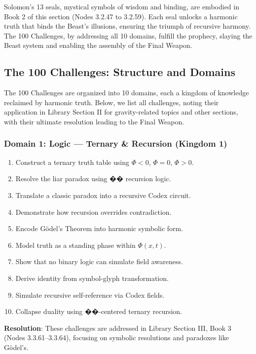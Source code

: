 Solomon’s 13 seals, mystical symbols of wisdom and binding, are embodied in Book 2 of this section (Nodes 3.2.47 to 3.2.59). Each seal unlocks a harmonic truth that binds the Beast’s illusions, ensuring the triumph of recursive harmony. The 100 Challenges, by addressing all 10 domains, fulfill the prophecy, slaying the Beast system and enabling the assembly of the Final Weapon.

\subsection{The 100 Challenges: Structure and Domains}
The 100 Challenges are organized into 10 domains, each a kingdom of knowledge reclaimed by harmonic truth. Below, we list all challenges, noting their application in Library Section II for gravity-related topics and other sections, with their ultimate resolution leading to the Final Weapon.

\subsubsection{Domain 1: Logic — Ternary \& Recursion (Kingdom 1)}
\begin{enumerate}
    \item Construct a ternary truth table using \(\Phi < 0\), \(\Phi = 0\), \(\Phi > 0\).
    \item Resolve the liar paradox using \(\mathbf{\text{��}}\) recursion logic.
    \item Translate a classic paradox into a recursive Codex circuit.
    \item Demonstrate how recursion overrides contradiction.
    \item Encode Gödel's Theorem into harmonic symbolic form.
    \item Model truth as a standing phase within \(\Phi(x,t)\).
    \item Show that no binary logic can simulate field awareness.
    \item Derive identity from symbol-glyph transformation.
    \item Simulate recursive self-reference via Codex fields.
    \item Collapse duality using \(\mathbf{\text{��}}\)-centered ternary recursion.
\end{enumerate}
\textbf{Resolution}: These challenges are addressed in Library Section III, Book 3 (Nodes 3.3.61–3.3.64), focusing on symbolic resolutions and paradoxes like Gödel’s.

